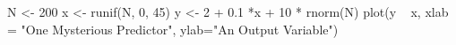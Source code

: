 \begin{Schunk}
\begin{Sinput}
 N <- 200
 x <- runif(N, 0, 45)
 y <- 2 + 0.1 *x + 10 * rnorm(N)
 plot(y ~ x, xlab = "One Mysterious Predictor", ylab="An Output Variable")
\end{Sinput}
\end{Schunk}
